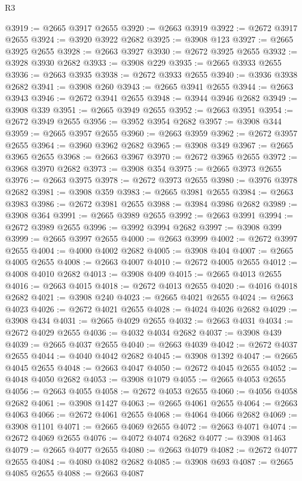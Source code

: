 \begin{lexlean}{R3}
\begin{coremodule}
@3919 := @2665 @3917 @2655
@3920 := @2663 @3919
@3922 := @2672 @3917 @2655
@3924 := @3920 @3922 @2682
@3925 := @3908 @123
@3927 := @2665 @3925 @2655
@3928 := @2663 @3927
@3930 := @2672 @3925 @2655
@3932 := @3928 @3930 @2682
@3933 := @3908 @229
@3935 := @2665 @3933 @2655
@3936 := @2663 @3935
@3938 := @2672 @3933 @2655
@3940 := @3936 @3938 @2682
@3941 := @3908 @260
@3943 := @2665 @3941 @2655
@3944 := @2663 @3943
@3946 := @2672 @3941 @2655
@3948 := @3944 @3946 @2682
@3949 := @3908 @339
@3951 := @2665 @3949 @2655
@3952 := @2663 @3951
@3954 := @2672 @3949 @2655
@3956 := @3952 @3954 @2682
@3957 := @3908 @344
@3959 := @2665 @3957 @2655
@3960 := @2663 @3959
@3962 := @2672 @3957 @2655
@3964 := @3960 @3962 @2682
@3965 := @3908 @349
@3967 := @2665 @3965 @2655
@3968 := @2663 @3967
@3970 := @2672 @3965 @2655
@3972 := @3968 @3970 @2682
@3973 := @3908 @354
@3975 := @2665 @3973 @2655
@3976 := @2663 @3975
@3978 := @2672 @3973 @2655
@3980 := @3976 @3978 @2682
@3981 := @3908 @359
@3983 := @2665 @3981 @2655
@3984 := @2663 @3983
@3986 := @2672 @3981 @2655
@3988 := @3984 @3986 @2682
@3989 := @3908 @364
@3991 := @2665 @3989 @2655
@3992 := @2663 @3991
@3994 := @2672 @3989 @2655
@3996 := @3992 @3994 @2682
@3997 := @3908 @399
@3999 := @2665 @3997 @2655
@4000 := @2663 @3999
@4002 := @2672 @3997 @2655
@4004 := @4000 @4002 @2682
@4005 := @3908 @404
@4007 := @2665 @4005 @2655
@4008 := @2663 @4007
@4010 := @2672 @4005 @2655
@4012 := @4008 @4010 @2682
@4013 := @3908 @409
@4015 := @2665 @4013 @2655
@4016 := @2663 @4015
@4018 := @2672 @4013 @2655
@4020 := @4016 @4018 @2682
@4021 := @3908 @240
@4023 := @2665 @4021 @2655
@4024 := @2663 @4023
@4026 := @2672 @4021 @2655
@4028 := @4024 @4026 @2682
@4029 := @3908 @434
@4031 := @2665 @4029 @2655
@4032 := @2663 @4031
@4034 := @2672 @4029 @2655
@4036 := @4032 @4034 @2682
@4037 := @3908 @439
@4039 := @2665 @4037 @2655
@4040 := @2663 @4039
@4042 := @2672 @4037 @2655
@4044 := @4040 @4042 @2682
@4045 := @3908 @1392
@4047 := @2665 @4045 @2655
@4048 := @2663 @4047
@4050 := @2672 @4045 @2655
@4052 := @4048 @4050 @2682
@4053 := @3908 @1079
@4055 := @2665 @4053 @2655
@4056 := @2663 @4055
@4058 := @2672 @4053 @2655
@4060 := @4056 @4058 @2682
@4061 := @3908 @1427
@4063 := @2665 @4061 @2655
@4064 := @2663 @4063
@4066 := @2672 @4061 @2655
@4068 := @4064 @4066 @2682
@4069 := @3908 @1101
@4071 := @2665 @4069 @2655
@4072 := @2663 @4071
@4074 := @2672 @4069 @2655
@4076 := @4072 @4074 @2682
@4077 := @3908 @1463
@4079 := @2665 @4077 @2655
@4080 := @2663 @4079
@4082 := @2672 @4077 @2655
@4084 := @4080 @4082 @2682
@4085 := @3908 @693
@4087 := @2665 @4085 @2655
@4088 := @2663 @4087

\end{coremodule}
\end{lexlean}
